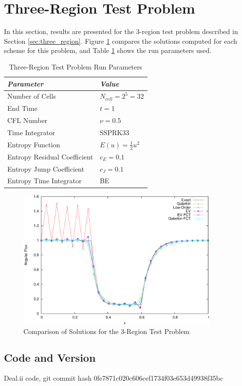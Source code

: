 \section{Three-Region Test Problem}

In this section, results are presented for the 3-region test
problem described in Section \ref{sec:three_region}.
Figure \ref{fig:three_region} compares the solutions computed
for each scheme for this problem, and
Table \ref{tab:three_region_run_parameters} shows the run parameters used.
\begin{table}[ht]\caption{Three-Region Test Problem Run Parameters}
\label{tab:three_region_run_parameters}
\centering
\begin{tabular}{l l}\toprule
\emph{Parameter} & \emph{Value}\\\midrule
Number of Cells & $N_{cell} = 2^5 = 32$\\
End Time & $t = 1$\\
CFL Number & $\nu = 0.5$\\
Time Integrator & SSPRK33\\\midrule
Entropy Function & $E(u) = \frac{1}{2}u^2$\\
Entropy Residual Coefficient & $c_E = 0.1$\\
Entropy Jump Coefficient & $c_J = 0.1$\\
Entropy Time Integrator & BE\\
\bottomrule\end{tabular}
\end{table}
\begin{figure}[ht]
   \centering
   \includegraphics[width=0.9\textwidth]{three_region/three_region.pdf}
   \caption{Comparison of Solutions for the 3-Region Test Problem}
   \label{fig:three_region}
\end{figure}
\subsection{Code and Version}
Deal.ii code, git commit hash 0fe7871c020c606cef1734f03e653d49938f35bc
